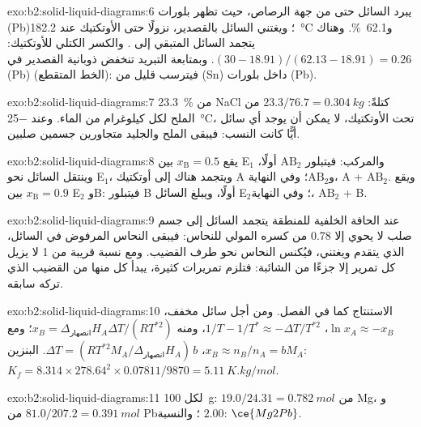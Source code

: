 \begin{solution}{exo:b2:solid-liquid-diagrams:6}
يبرد السائل حتى  من جهة الرصاص، حيث تظهر بلورات (Pb)؛ ويغتني
السائل بالقصدير، نزولًا حتى الأوتكتيك عند \qty{182.2}{\degreeCelsius}
و62.1~\%. وهناك يتجمد السائل المتبقي إلى .
والكسر الكتلي للأوتكتيك: $(30 - 18.91)/(62.13 - 18.91) = 0.26$. وبمتابعة
التبريد تنخفض ذوبانية القصدير في (Pb) (الخط المتقطع): فيترسب قليل من (Sn)
داخل بلورات (Pb).
\end{solution}

\begin{solution}{exo:b2:solid-liquid-diagrams:7}
23.3~\% من NaCl كتلةً: $23.3/76.7 = \qty{0.304}{kg}$ من الملح لكل كيلوغرام من
الماء. وعند \qty{-25}{\degreeCelsius}، تحت الأوتكتيك، لا يمكن أن يوجد أي سائل
أيًّا كانت النسب: فيبقى الملح والجليد متجاورين جسمين صلبين.
\end{solution}

\begin{solution}{exo:b2:solid-liquid-diagrams:8}
يقع $x_{\mathrm B} = 0.5$ بين E$_1$ والمركب: فيتبلور $\mathrm{AB_2}$
أولًا، وينتقل السائل نحو E$_1$، ويتجمد هناك إلى
أوتكتيك A و$\mathrm{AB_2}$؛ وفي النهاية، A + $\mathrm{AB_2}$.
ويقع $x_{\mathrm B} = 0.9$ بين E$_2$ وB: فيتبلور B أولًا، ويبلغ السائل
E$_2$؛ وفي النهاية، $\mathrm{AB_2}$ + B.
\end{solution}

\begin{solution}{exo:b2:solid-liquid-diagrams:9}
عند الحافة الخلفية للمنطقة يتجمد السائل إلى جسم صلب لا يحوي إلا 0.78
من كسره المولي للنحاس: فيبقى النحاس المرفوض في السائل، الذي
يتقدم ويغتني، فيُكنس النحاس نحو طرف القضيب.
ومع نسبة قريبة من 1 لا يزيل كل تمرير إلا جزءًا من الشائبة:
فتلزم تمريرات كثيرة، يبدأ كل منها من القضيب الذي تركه سابقه.
\end{solution}

\begin{solution}{exo:b2:solid-liquid-diagrams:10}
الاستنتاج كما في الفصل. ومن أجل سائل مخفف، $\ln x_A \approx -x_B$، $1/T -
1/T^* \approx -\Delta T/T^{*2}$، ومنه $x_B = \Delta_{\text{انصهار}}H_A\Delta T/(RT^{*2})$؛
ومع $x_B \approx n_B/n_A = bM_A$، $\Delta T = (RT^{*2}M_A/\Delta_{\text{انصهار}}H_A)\,b$.
البنزين: $K_f = 8.314 \times 278.64^2 \times 0.07811/9870 = \qty{5.11}{K.kg/mol}$.
\end{solution}

\begin{solution}{exo:b2:solid-liquid-diagrams:11}
لكل \qty{100}{g}: $19.0/24.31 = \qty{0.782}{mol}$ من Mg، و$81.0/207.2 =
\qty{0.391}{mol}$ من Pb؛ والنسبة $2.00$: $\ce{Mg2Pb}$.
\end{solution}

